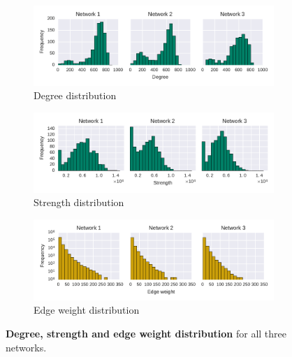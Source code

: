 \begin{figure}[!t]
	\centering
	\begin{subfigure}[b]{1.0\textwidth}
	\centering
	\includegraphics[width=\textwidth]{Figures/stat-degreeDist}
	\caption[Degree distribution]{Degree distribution}
	\label{fig:statDegreeDist}
	\vspace*{5mm}
	\end{subfigure} 
	\begin{subfigure}[b]{1.0\textwidth}
	\centering
	\includegraphics[width=\textwidth]{Figures/stat-strengthDist}
	\caption[Strength distribution]{Strength distribution}
	\label{fig:statStrengthDist}
	\vspace*{5mm}
	\end{subfigure}
	\begin{subfigure}[b]{1.0\textwidth}
	\centering
	\includegraphics[width=\textwidth]{Figures/stat-edgeWeightDist}
	\caption[Edge weight distribution]{Edge weight distribution}
	\label{fig:statEdgeWeightDist}
	\vspace*{5mm}
	\end{subfigure}
	\caption[Degree, strength and edge weight distribution]{\textbf{Degree, strength and edge weight distribution} for all three networks.}
	\label{fig:distributions}
\end{figure}



